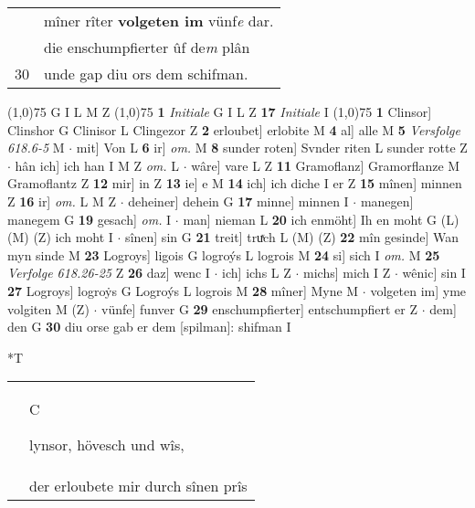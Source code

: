 \documentclass[8pt,a4paper,notitlepage]{article}
\begin{document}
\begin{table}[ht]
\begin{minipage}[t]{0.5\linewidth}
\begin{tabular}{rl}
 & mîner rîter \textbf{volgeten im} vünf\textit{e} dar.\\ 
 & die enschumpfierter ûf de\textit{m} plân\\ 
30 & unde gap diu ors dem schifman.\\ 
\end{tabular}
\scriptsize
\line(1,0){75} \newline
G I L M Z \newline
\line(1,0){75} \newline
\textbf{1} \textit{Initiale} G I L Z  \textbf{17} \textit{Initiale} I  \newline
\line(1,0){75} \newline
\textbf{1} Clinsor] Clinshor G Clinisor L Clingezor Z \textbf{2} erloubet] erlobite M \textbf{4} al] alle M \textbf{5} \textit{Versfolge 618.6-5} M   $\cdot$ mit] Von L \textbf{6} ir] \textit{om.} M \textbf{8} sunder roten] Svnder riten L sunder rotte Z  $\cdot$ hân ich] ich han I M Z \textit{om.} L  $\cdot$ wâre] vare L Z \textbf{11} Gramoflanz] Gramorflanze M Gramoflantz Z \textbf{12} mir] in Z \textbf{13} ie] e M \textbf{14} ich] ich diche I er Z \textbf{15} mînen] minnen Z \textbf{16} ir] \textit{om.} L M Z  $\cdot$ deheiner] dehein G \textbf{17} minne] minnen I  $\cdot$ manegen] manegem G \textbf{19} gesach] \textit{om.} I  $\cdot$ man] nieman L \textbf{20} ich enmöht] Ih en moht G (L) (M) (Z) ich moht I  $\cdot$ sînen] sin G \textbf{21} treit] truͯch L (M) (Z) \textbf{22} mîn gesinde] Wan myn sinde M \textbf{23} Logroys] ligois G logroýs L logrois M \textbf{24} si] sich I \textit{om.} M \textbf{25} \textit{Verfolge 618.26-25} Z  \textbf{26} daz] wenc I  $\cdot$ ich] ichs L Z  $\cdot$ michs] mich I Z  $\cdot$ wênic] sin I \textbf{27} Logroys] logroẏs G Logroýs L logrois M \textbf{28} mîner] Myne M  $\cdot$ volgeten im] yme volgiten M (Z)  $\cdot$ vünfe] funver G \textbf{29} enschumpfierter] entschumpfiert er Z  $\cdot$ dem] den G \textbf{30} diu orse gab er dem [spilman]: shifman I \newline
\end{minipage}
\hspace{0.5cm}
\begin{minipage}[t]{0.5\linewidth}
\small
\begin{center}*T
\end{center}
\begin{tabular}{rl}
 & \begin{large}C\end{large}lynsor, hövesch und wîs,\\ 
 & der erloubete mir durch sînen prîs\\ 

\end{tabular}
\end{minipage}
\end{table}
\end{document}
